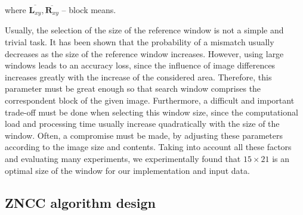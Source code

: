 \documentclass[conference]{IEEEtran}
\begin{document}
\noindent where $\overline{\mathbf{L}_{xy}},\overline{\mathbf{R}_{xy}}$ -- block means.

Usually, the selection of the size of the reference window is not a simple and trivial task. It has been shown that the probability of a mismatch usually decreases as the size of the reference window increases. However, using large windows leads to an accuracy loss, since the influence of image differences increases greatly with the increase of the considered area. Therefore, this parameter must be great enough so that search window comprises the correspondent block of the given image. Furthermore, a difficult and important trade-off must be done when selecting this window size, since the computational load and processing time usually increase quadratically with the size of the window. Often, a compromise must be made, by adjusting these parameters according to the image size and contents. Taking into account all these factors and evaluating many experiments, we experimentally found that $15 \times 21$ is an optimal size of the window for our implementation and input data.

\subsection{ZNCC algorithm design}
\end{document}
